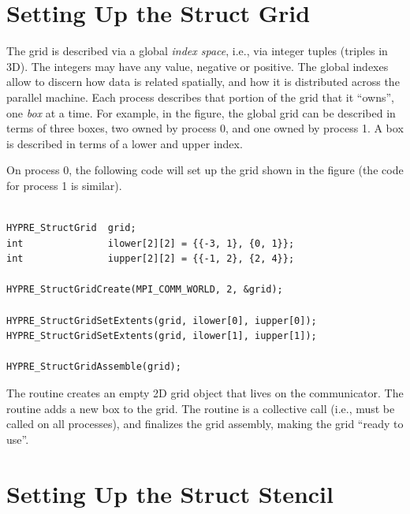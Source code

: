 
\section{Setting Up the Struct Grid}
\label{Setting Up the Struct Grid}

The grid is described via a global {\em index space}, i.e., via
integer tuples (triples in 3D).  The integers may have any value,
negative or positive.  The global indexes allow \hypre{} to discern
how data is related spatially, and how it is distributed across the
parallel machine.  Each process describes that portion of the grid
that it ``owns'', one {\em box} at a time.  For example, in the
figure, the global grid can be described in terms of three boxes, two
owned by process 0, and one owned by process 1.  A box is described in
terms of a lower and upper index.

On process 0, the following code will set up the grid shown in the
figure (the code for process 1 is similar).
\begin{display}
\begin{verbatim}

HYPRE_StructGrid  grid;
int               ilower[2][2] = {{-3, 1}, {0, 1}};
int               iupper[2][2] = {{-1, 2}, {2, 4}};

HYPRE_StructGridCreate(MPI_COMM_WORLD, 2, &grid);

HYPRE_StructGridSetExtents(grid, ilower[0], iupper[0]);
HYPRE_StructGridSetExtents(grid, ilower[1], iupper[1]);

HYPRE_StructGridAssemble(grid);

\end{verbatim}
\end{display}
The  routine creates an empty 2D grid object that lives
on the  communicator.  The 
routine adds a new box to the grid.  The  routine is
a collective call (i.e., must be called on all processes), and
finalizes the grid assembly, making the grid ``ready to use''.


\section{Setting Up the Struct Stencil}
\label{Setting Up the Struct Stencil}

